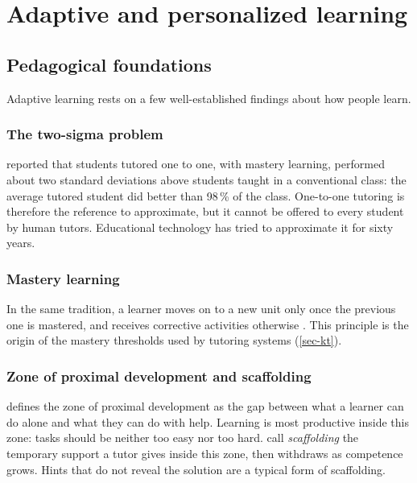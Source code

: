 \section{Adaptive and personalized learning}
\label{sec-adaptive}

\subsection{Pedagogical foundations}
\label{subsec-foundations}

Adaptive learning rests on a few well-established findings about how
people learn.

\subsubsection{The two-sigma problem}
\citet{bloom1984} reported that students
tutored one to one, with mastery learning, performed about two standard
deviations above students taught in a conventional class: the average
tutored student did better than 98\,\% of the class. One-to-one tutoring is
therefore the reference to approximate, but it cannot be offered to every
student by human tutors. Educational technology has tried to approximate
it for sixty years.

\subsubsection{Mastery learning}
In the same tradition, a learner moves on
to a new unit only once the previous one is mastered, and receives
corrective activities otherwise \cite{bloom1984}. This principle is the
origin of the mastery thresholds used by tutoring systems
(\cref{sec-kt}).

\subsubsection{Zone of proximal development and scaffolding}

\citet{vygotsky1978} defines the zone of proximal development as the gap
between what a learner can do alone and what they can do with help.
Learning is most productive inside this zone: tasks should be neither too
easy nor too hard. \citet{wood1976} call \emph{scaffolding} the temporary
support a tutor gives inside this zone, then withdraws as competence grows.
Hints that do not reveal the solution are a typical form of scaffolding.

